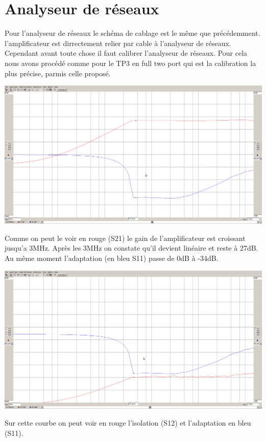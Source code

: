 \documentclass[a4paper,12pt]{report}            %
\begin{document}
\chapter{Analyseur de réseaux}
Pour l'analyseur de réseaux le schéma de cablage est le même que précédemment. l'amplificateur
est dirrectement relier par cable à l'analyseur de réseaux.
Cependant avant toute chose il faut calibrer l'analyseur de réseaux. Pour cela 
nous avons procédé comme pour le TP3 en full two port qui est la calibration la plus précise, parmis
celle proposé.
\begin{center}\includegraphics[scale = 0.25]{pic/analys-res.png}\\ \end{center}
Comme on peut le voir en rouge (S21) le gain de l'amplificateur est croissant 
jusqu'a 3MHz. Après les 3MHz on constate qu'il devient linéaire et reste à 27dB.
Au même moment l'adaptation (en bleu S11) passe de 0dB à -34dB.
\begin{center}\includegraphics[scale = 0.25]{pic/isolation.png}\\ \end{center}
Sur cette courbe on peut voir en rouge l'isolation (S12) et l'adaptation en bleu (S11).
\end{document}

